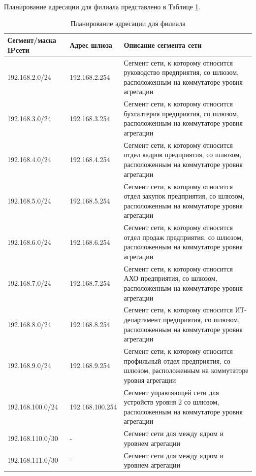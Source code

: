 \documentclass[14pt, a4paper]{extarticle}
\numberwithin{equation}{section}
\begin{document}
\newpage
Планирование адресации для филиала представлено в Таблице \ref{table:filialIpPlan}.
\begin{table}[H]
\centering
\small
\caption{Планирование адресации для филиала}
\label{table:filialIpPlan}
\begin{tabular}{|m{4cm}|m{3cm}|m{8cm}|}
\hline
\textbf{Сегмент/маска IPсети} & \textbf{Адрес шлюза} & \textbf{Описание сегмента сети} \\
\hline
192.168.2.0/24 & 192.168.2.254 & Сегмент сети, к которому относится руководство предприятия, со шлюзом, расположенным на коммутаторе уровня агрегации
\\ \hline
192.168.3.0/24 & 192.168.3.254 & Сегмент сети, к которому относится бухгалтерия предприятия, со шлюзом, расположенным на коммутаторе уровня агрегации
\\ \hline
192.168.4.0/24 & 192.168.4.254 & Сегмент сети, к которому относится отдел кадров предприятия, со шлюзом, расположенным на коммутаторе уровня агрегации
\\ \hline
192.168.5.0/24 & 192.168.5.254 & Сегмент сети, к которому относится отдел закупок предприятия, со шлюзом, расположенным на коммутаторе уровня агрегации
\\ \hline
192.168.6.0/24 & 192.168.6.254 & Сегмент сети, к которому относится отдел продаж предприятия, со шлюзом, расположенным на коммутаторе уровня агрегации
\\ \hline
192.168.7.0/24 & 192.168.7.254 & Сегмент сети, к которому относится АХО предприятия, со шлюзом, расположенным на коммутаторе уровня агрегации
\\ \hline
192.168.8.0/24 & 192.168.8.254 & Сегмент сети, к которому относится ИТ-департамент предприятия, со шлюзом, расположенным на коммутаторе уровня агрегации
\\ \hline
192.168.9.0/24 & 192.168.9.254 & Сегмент сети, к которому относится профильный отдел предприятия, со шлюзом, расположенным на коммутаторе уровня агрегации
\\ \hline
192.168.100.0/24 & 192.168.100.254 & Сегмент управляющей сети для устройств уровня 2 со шлюзом, расположенным на коммутаторе уровня агрегации 
\\ \hline
192.168.110.0/30 & - & Сегмент сети для между ядром и уровнем агрегации
\\ \hline
192.168.111.0/30 & - & Сегмент сети для между ядром и уровнем агрегации
\\ \hline
\end{tabular}
\end{table}
\end{document}
